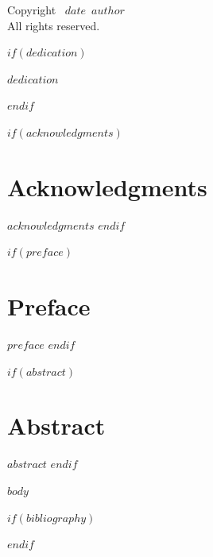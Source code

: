 \documentclass[12pt,oneside]{book}
\def\booktitle{$book_title$}
\def\bookauthor{$author$}
\def\bookdate{$date$}
\def\bookpublisher{$publisher$}
\def\bookedition{$edition$}
\begin{document}
\frontmatter

\begin{titlepage}
\begin{center}
\vspace*{1in}
{\Huge\bfseries\booktitle\par}
\vspace{0.5in}
{\Large\bookauthor\par}
\vfill
{\large\bookedition}\\
\bigskip
{\large\bookpublisher}\\
{\large\bookdate}
\end{titlepage}

\thispagestyle{empty}
\vspace*{\fill}
Copyright \textcopyright\ \bookdate\ \bookauthor\\
All rights reserved.
\vfill

$if(dedication)$
\clearpage
\begin{center}
\textit{$dedication$}
\end{center}
$endif$

$if(acknowledgments)$
\chapter{Acknowledgments}
$acknowledgments$
$endif$

$if(preface)$
\chapter{Preface}
$preface$
$endif$

$if(abstract)$
\chapter{Abstract}
$abstract$
$endif$

\tableofcontents

\listoffigures

\listoftables

\lstlistoflistings

\mainmatter

$body$

\backmatter

$if(bibliography)$


$endif$

\printindex
\end{document}
